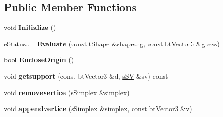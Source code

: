 \subsection*{Public Member Functions}
\begin{DoxyCompactItemize}
\item 
\mbox{\label{structgjkepa2__impl_1_1GJK_a1cd1cd7827d81afe62d27022fc3a5a38}} 
void {\bfseries Initialize} ()
\item 
\mbox{\label{structgjkepa2__impl_1_1GJK_aef02ebcb7c4628eea04d9fd6a6a2867a}} 
e\+Status\+::\+\_\+ {\bfseries Evaluate} (const \hyperlink{structgjkepa2__impl_1_1MinkowskiDiff}{t\+Shape} \&shapearg, const bt\+Vector3 \&guess)
\item 
\mbox{\label{structgjkepa2__impl_1_1GJK_a1cb2261d5ad6b120b6741dbb32bc0961}} 
bool {\bfseries Enclose\+Origin} ()
\item 
\mbox{\label{structgjkepa2__impl_1_1GJK_a6bc7302e13b00fdf02d226b060cda5df}} 
void {\bfseries getsupport} (const bt\+Vector3 \&d, \hyperlink{structgjkepa2__impl_1_1GJK_1_1sSV}{s\+SV} \&sv) const
\item 
\mbox{\label{structgjkepa2__impl_1_1GJK_a60f7bd45348913e0fd18b3227f727897}} 
void {\bfseries removevertice} (\hyperlink{structgjkepa2__impl_1_1GJK_1_1sSimplex}{s\+Simplex} \&simplex)
\item 
\mbox{\label{structgjkepa2__impl_1_1GJK_aae2a3d9ae71bf888ee700a0f18b9125b}} 
void {\bfseries appendvertice} (\hyperlink{structgjkepa2__impl_1_1GJK_1_1sSimplex}{s\+Simplex} \&simplex, const bt\+Vector3 \&v)
\end{DoxyCompactItemize}
